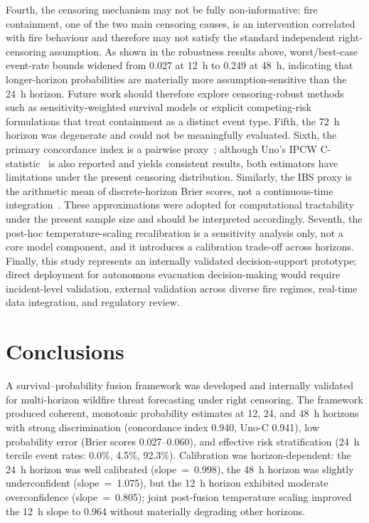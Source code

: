 \documentclass[fire,article,submit,pdftex]{../Definitions/mdpi}
\begin{document}
Fourth, the censoring mechanism may not be fully non-informative: fire containment, one of the two main censoring causes, is an intervention correlated with fire behaviour and therefore may not satisfy the standard independent right-censoring assumption.
As shown in the robustness results above, worst/best-case event-rate bounds widened from 0.027 at 12~h to 0.249 at 48~h, indicating that longer-horizon probabilities are materially more assumption-sensitive than the 24~h horizon.
Future work should therefore explore censoring-robust methods such as sensitivity-weighted survival models or explicit competing-risk formulations that treat containment as a distinct event type.
Fifth, the 72~h horizon was degenerate and could not be meaningfully evaluated.
Sixth, the primary concordance index is a pairwise proxy~\cite{Harrell1996}; although Uno's IPCW C-statistic~\cite{Uno2011} is also reported and yields consistent results, both estimators have limitations under the present censoring distribution. Similarly, the IBS proxy is the arithmetic mean of discrete-horizon Brier scores, not a continuous-time integration~\cite{Graf1999}.
These approximations were adopted for computational tractability under the present sample size and should be interpreted accordingly.
Seventh, the post-hoc temperature-scaling recalibration is a sensitivity analysis only, not a core model component, and it introduces a calibration trade-off across horizons.
Finally, this study represents an internally validated decision-support prototype; direct deployment for autonomous evacuation decision-making would require incident-level validation, external validation across diverse fire regimes, real-time data integration, and regulatory review.

\section{Conclusions}\label{sec:conclusions}

A survival--probability fusion framework was developed and internally validated for multi-horizon wildfire threat forecasting under right censoring.
The framework produced coherent, monotonic probability estimates at 12, 24, and 48~h horizons with strong discrimination (concordance index 0.940, Uno-C 0.941), low probability error (Brier scores 0.027--0.060), and effective risk stratification (24~h tercile event rates: 0.0\%, 4.5\%, 92.3\%).
Calibration was horizon-dependent: the 24~h horizon was well calibrated (slope~=~0.998), the 48~h horizon was slightly underconfident (slope~=~1.075), but the 12~h horizon exhibited moderate overconfidence (slope~=~0.805); joint post-fusion temperature scaling improved the 12~h slope to 0.964 without materially degrading other horizons.
\end{document}
